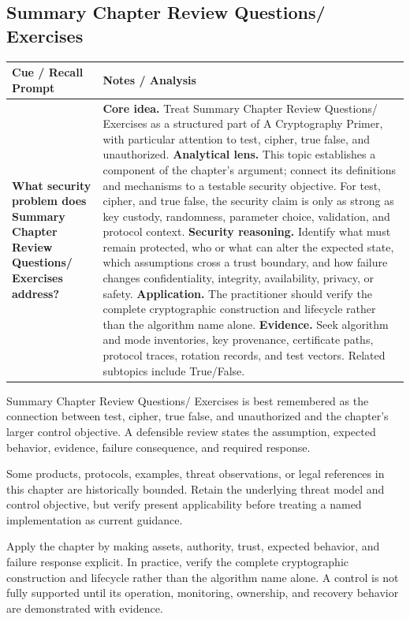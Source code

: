 \documentclass[11pt]{article}
\newcommand{\CornellHeader}{%
\rowcolor{Navy}\color{white}\bfseries Cue / Recall Prompt & \color{white}\bfseries Notes / Analysis\\\hline}
\newcommand{\CornellRow}[2]{%
\cellcolor{CueGray}\RaggedRight\textbf{#1} & \RaggedRight #2\\\hline}
\begin{document}
\subsection*{Summary Chapter Review Questions/ Exercises}
\begin{longtable}{>{\RaggedRight\arraybackslash}p{}|>{\RaggedRight\arraybackslash}p{}}
\CornellHeader
\CornellRow{What security problem does Summary Chapter Review Questions/ Exercises address?}{\textbf{Core idea.} Treat Summary Chapter Review Questions/ Exercises as a structured part of A Cryptography Primer, with particular attention to test, cipher, true false, and unauthorized. \textbf{Analytical lens.} This topic establishes a component of the chapter's argument; connect its definitions and mechanisms to a testable security objective. For test, cipher, and true false, the security claim is only as strong as key custody, randomness, parameter choice, validation, and protocol context. \textbf{Security reasoning.} Identify what must remain protected, who or what can alter the expected state, which assumptions cross a trust boundary, and how failure changes confidentiality, integrity, availability, privacy, or safety. \textbf{Application.} The practitioner should verify the complete cryptographic construction and lifecycle rather than the algorithm name alone. \textbf{Evidence.} Seek algorithm and mode inventories, key provenance, certificate paths, protocol traces, rotation records, and test vectors. Related subtopics include True/False.}
\end{longtable}
\begin{topicsummary}
Summary Chapter Review Questions/ Exercises is best remembered as the connection between test, cipher, true false, and unauthorized and the chapter's larger control objective. A defensible review states the assumption, expected behavior, evidence, failure consequence, and required response.
\end{topicsummary}
\begin{historybox}
Some products, protocols, examples, threat observations, or legal references in this chapter are historically bounded. Retain the underlying threat model and control objective, but verify present applicability before treating a named implementation as current guidance.
\end{historybox}
\begin{defensebox}
Apply the chapter by making assets, authority, trust, expected behavior, and failure response explicit. In practice, verify the complete cryptographic construction and lifecycle rather than the algorithm name alone. A control is not fully supported until its operation, monitoring, ownership, and recovery behavior are demonstrated with evidence.
\end{defensebox}
\end{document}
